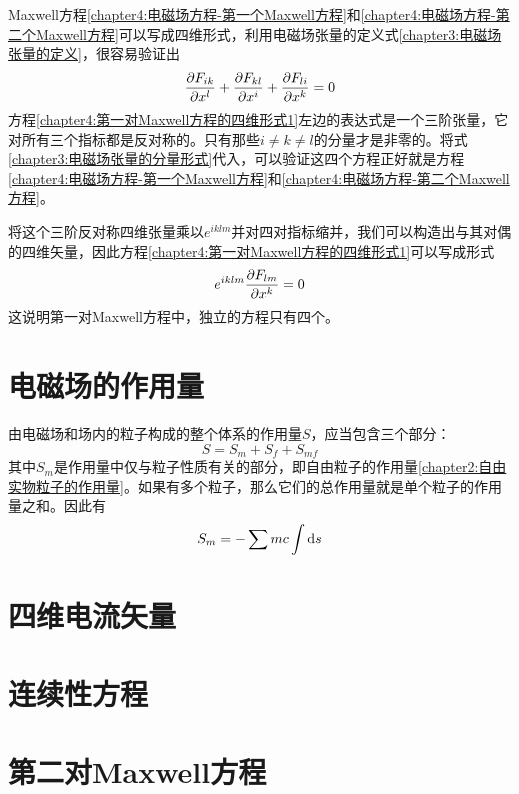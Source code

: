 Maxwell方程\eqref{chapter4:电磁场方程-第一个Maxwell方程}和\eqref{chapter4:电磁场方程-第二个Maxwell方程}可以写成四维形式，利用电磁场张量的定义式\eqref{chapter3:电磁场张量的定义}，很容易验证出
\begin{equation}
	\frac{\partial F_{ik}}{\partial x^l} + \frac{\partial F_{kl}}{\partial x^i} + \frac{\partial F_{li}}{\partial x^k} = 0
	\label{chapter4:第一对Maxwell方程的四维形式1}
\end{equation}
方程\eqref{chapter4:第一对Maxwell方程的四维形式1}左边的表达式是一个三阶张量，它对所有三个指标都是反对称的。只有那些$i\neq k\neq l$的分量才是非零的。将式\eqref{chapter3:电磁场张量的分量形式}代入，可以验证这四个方程正好就是方程\eqref{chapter4:电磁场方程-第一个Maxwell方程}和\eqref{chapter4:电磁场方程-第二个Maxwell方程}。

将这个三阶反对称四维张量乘以$e^{iklm}$并对四对指标缩并，我们可以构造出与其对偶的四维矢量，因此方程\eqref{chapter4:第一对Maxwell方程的四维形式1}可以写成形式
\begin{equation}
	e^{iklm}\frac{\partial F_{lm}}{\partial x^k} = 0
	\label{chapter4:第一对Maxwell方程的四维形式2}
\end{equation}
这说明第一对Maxwell方程中，独立的方程只有四个。

\section{电磁场的作用量}

由电磁场和场内的粒子构成的整个体系的作用量$S$，应当包含三个部分：
\begin{equation}
	S = S_m+S_f+S_{mf}
\end{equation}
其中$S_m$是作用量中仅与粒子性质有关的部分，即自由粒子的作用量\eqref{chapter2:自由实物粒子的作用量}。如果有多个粒子，那么它们的总作用量就是单个粒子的作用量之和。因此有
\begin{equation}
	S_m = -\sum mc\int \mathrm{d} s
	\label{chapter4:电磁场作用量中粒子的部分}
\end{equation}

\section{四维电流矢量}

\section{连续性方程}

\section{第二对Maxwell方程}

